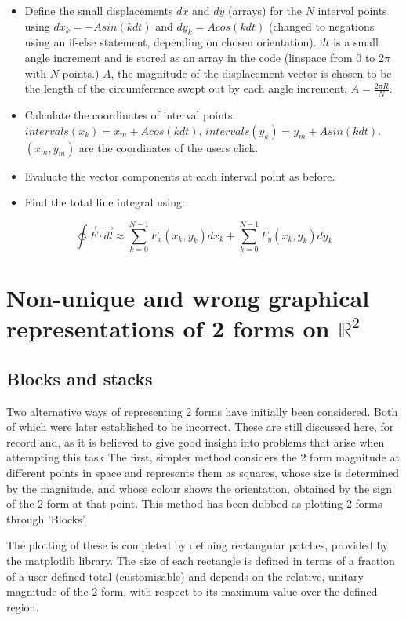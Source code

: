 \documentclass[11]{report}
\begin{document}
\begin{itemize}
	\item Define the small displacements $dx$ and $dy$ (arrays) for the $N$ interval points using $dx_k = -Asin(kdt)$ and $dy_k = Acos(kdt)$ (changed to negations using an if-else statement, depending on chosen orientation). $dt$ is a small angle increment and is stored as an array in the code (linspace from 0 to 2$\pi$ with $N$ points.) $A$, the magnitude of the displacement vector is chosen to be the length of the circumference swept out by each angle increment, $A = \frac{2\pi R}{N}$. 
	\item Calculate the coordinates of interval points: $intervals(x_k) = x_m + Acos(kdt)$, $intervals(y_k) = y_m + Asin(kdt)$. $(x_m,y_m)$ are the coordinates of the users click. 
	\item Evaluate the vector components at each interval point as before.
	\item Find the total line integral using:
\end{itemize}

\begin{equation}
	\ointctrclockwise \vec{F} \cdot \vec{dl} \approx \sum_{k=0}^{N-1} F_x(x_k,y_k)dx_k + \sum_{k=0}^{N-1} F_y(x_k,y_k)dy_k
\end{equation}



\section{Non-unique and wrong graphical representations of 2 forms on $\mathbb{R}^{2}$}
\subsection{Blocks and stacks}
Two alternative ways of representing 2 forms have initially been considered. Both of which were later established to be incorrect. These are still discussed here, for record and, as it is believed to give good insight into problems that arise when attempting this task 
The first, simpler method considers the 2 form magnitude at different points in space and represents them as squares, whose size is determined by the magnitude, and whose colour shows the orientation, obtained by the sign of the 2 form at that point. This method has been dubbed as plotting 2 forms through 'Blocks'.

\noindent The plotting of these is completed by defining rectangular patches, provided by the matplotlib library. The size of each rectangle is defined in terms of a fraction of a user defined total (customisable) and depends on the relative, unitary magnitude of the 2 form, with respect to its maximum value over the defined region.
\end{document}
